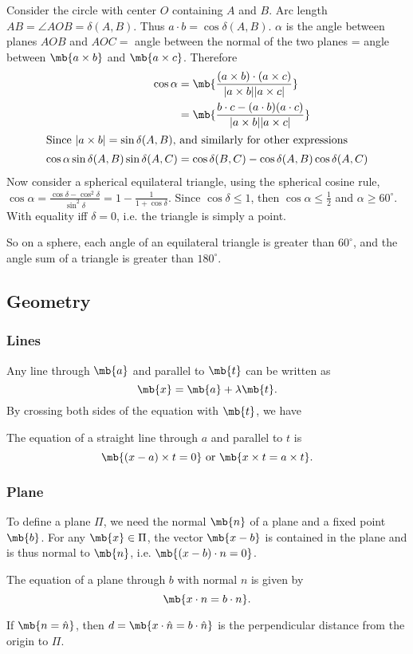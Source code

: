\documentclass[a4paper]{article}
\begin{document}
Consider the circle with center $O$ containing $A$ and $B$. Arc length $AB = \angle AOB = \delta(A, B)$. Thus $a\cdot b = \cos \delta(A, B)$. $\alpha$ is the angle between planes $AOB$ and $AOC = $ angle between the normal of the two planes = angle between $\mb{a\times b}$ and $\mb{a \times c}$. Therefore
\begin{align*}
  \cos \alpha &= \mb{\frac{(a\times b)\cdot(a\times c)}{|a\times b||a\times c|}}\\
  &= \mb{\frac{b\cdot c - (a\cdot b)(a\cdot c)}{|a\times b||a\times c|}}\\
\intertext{Since $|a\times b| = \sin\delta(A, B)$, and similarly for other expressions}
  \cos\alpha\sin\delta(A, B)\sin\delta(A, C) &= \cos\delta(B, C) - \cos\delta(A, B)\cos\delta(A, C)
\end{align*}
Now consider a spherical equilateral triangle, using the spherical cosine rule, $\cos\alpha = \frac{\cos\delta - \cos^2\delta}{\sin^2\delta} = 1 - \frac{1}{1 + \cos\delta}$. Since $\cos\delta\leq 1$, then $\cos\alpha\leq \frac{1}{2}$ and $\alpha \geq 60^\circ$. With equality iff $\delta = 0$, i.e. the triangle is simply a point.

So on a sphere, each angle of an equilateral triangle is greater than $60^\circ$, and the angle sum of a triangle is greater than $180^\circ$.

\subsection{Geometry}
\subsubsection{Lines}
Any line through $\mb{a}$ and parallel to $\mb{t}$ can be written as
\[
\mb{x} = \mb{a} + \lambda\mb{t}.
\]
By crossing both sides of the equation with $\mb{t}$, we have
\begin{thm} The equation of a straight line through $a$ and parallel to $t$ is
  \[
  \mb{(x - a)\times t = 0}\text{ or }\mb{x\times t = a\times t}.
  \]
\end{thm}
\subsubsection{Plane}
To define a plane $\Pi$, we need the normal $\mb{n}$ of a plane and a fixed point $\mb{b}$.  For any $\mb{x}\in \Pi$, the vector $\mb{x - b}$ is contained in the plane and is thus normal to $\mb{n}$, i.e. $\mb{(x - b)\cdot n = 0}$.
\begin{thm}
  The equation of a plane through $b$ with normal $n$ is given by
  \[
  \mb{x\cdot n = b\cdot n}.
  \]
\end{thm}
If $\mb{n = \hat n}$, then $d = \mb{x\cdot\hat{n} = b\cdot\hat{n}}$ is the perpendicular distance from the origin to $\Pi$.
\end{document}
